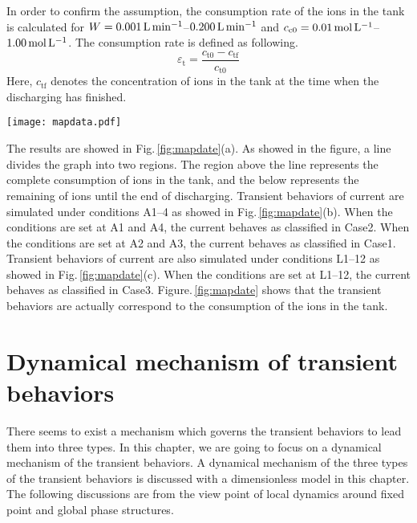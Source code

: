 \documentclass[a4paper]{article}
\newcommand{\mfigref}[2]{Fig.\,\ref{#1}(#2)}
\newcommand{\ifigref}[1]{Figure.\,\ref{#1}}
\newcommand{\Cco}{c_{\rm c0}}
\newcommand{\M}{{\rm mol\,L^{-1}}}
\newcommand{\fr}{{\rm L\,min^{-1}}}
\begin{document}
In order to confirm the assumption, the consumption rate of the ions in the tank is calculated for $W=0.001\,\fr$--$0.200\,\fr$ and $\Cco=0.01\,\M$--$1.00\,\M$. 
The consumption rate is defined as following. 
\begin{equation}
 \varepsilon_\mathrm{t}=\frac{c_\mathrm{t0}-c_\mathrm{tf}}{c_\mathrm{t0}}
\end{equation}
Here, $c_\mathrm{tf}$ denotes the concentration of ions in the tank at the time when the discharging has finished. 
\begin{figure*}[h]
 \centering
 \texttt{[image: mapdata.pdf]}
 \caption{Relationship between transient behaviors of current and consumption rate of ions in tank. (a)Consumption rate of the ions in the tank. A line divides the graph into two areas. (b)Transient behaviors of current simulated under conditions A1 and A4 (above the line) and A2 and A3 (below the line). When conditions are set at A1 and A4, the transient behaviors of current are categorized into Case2, and when conditions are set at A2 and A3, the transient behaviors of current are categorized into Case1. (c)Transient behaviors of current simulated under conditions (on the line). When conditions are set at L1--12, the transient behaviors of current are categorized into Case3. }
 \label{fig:mapdate}
\end{figure*}
The results are showed in \mfigref{fig:mapdate}{a}. 
As showed in the figure, a line divides the graph into two regions. 
The region above the line represents 
the complete consumption of ions in the tank, 
and the below represents 
the remaining of ions until the end of discharging. 
Transient behaviors of current are simulated 
under conditions A1--4 as showed in \mfigref{fig:mapdate}{b}.  
When the conditions are set at A1 and A4, 
the current behaves as classified in Case2. 
When the conditions are set at A2 and A3, 
the current behaves as classified in Case1.
Transient behaviors of current are also simulated
under conditions L1--12 as showed in \mfigref{fig:mapdate}{c}. 
When the conditions are set at L1--12, 
the current behaves as classified in Case3. 
\ifigref{fig:mapdate} shows that 
the transient behaviors 
are actually correspond to the consumption of the ions in the tank. 
\section{Dynamical mechanism of transient behaviors}%
There seems to exist a mechanism which governs the transient behaviors to lead them into three types.
In this chapter, we are going to focus on a dynamical mechanism of the transient behaviors. 
A dynamical mechanism of the three types of the transient behaviors is discussed with a dimensionless model in this chapter. 
The following discussions are from the view point of local dynamics around fixed point and global phase structures. 
\end{document}
